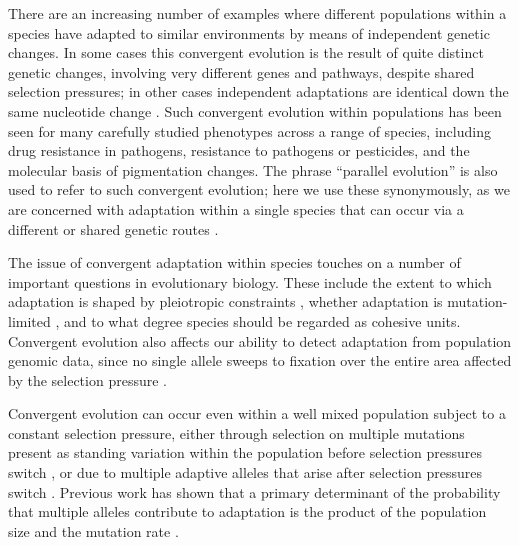 \documentclass{article}
\begin{document}
There are an increasing number of examples where
different populations within a species have
adapted to similar environments by means of independent genetic changes. 
In some cases this convergent evolution is the result of quite
distinct genetic changes, involving very different genes and pathways, despite shared selection pressures; 
in other cases independent adaptations are identical down the same
nucleotide change
\citep{Jeong20141,stern2013genetic,MartinOrgogozo:13, Conte2012}. 
Such convergent evolution within populations has been seen for many
carefully studied phenotypes across a range of species, 
including drug resistance in pathogens,
resistance to pathogens or pesticides,
and the molecular basis of pigmentation changes.
The phrase ``parallel evolution'' is also used to refer to such convergent evolution;
here we use these synonymously, 
as we are concerned with adaptation within a single
species that can occur via a different or shared genetic routes \citep[see][for more discussion]{Arendt:08}.

The issue of convergent adaptation within species touches on a number
of important questions in evolutionary biology. 
These include the extent to which adaptation is shaped by pleiotropic constraints \citep{Haldane:book,Orr:05},
whether adaptation is mutation-limited \citep{Bradshaw:91,karasov2010}, 
and to what degree species should be regarded as cohesive units. 
Convergent evolution also affects our ability to detect adaptation from population genomic data,
since no single allele sweeps to fixation over the entire area affected by the selection pressure \citep{softsweepsIII}.

Convergent evolution can occur even within a well mixed population
subject to a constant selection pressure, 
either through selection on multiple mutations present as standing variation within the population
before selection pressures switch \citep{Orr:01,softsweepsI},
or due to multiple adaptive alleles that arise after selection pressures switch \citep{softsweepsII}. 
Previous work has shown that 
a primary determinant of the probability that multiple alleles contribute to adaptation
is the product of the population size and the mutation rate \citep[see][for a review]{MesserPetrov}. 
\end{document}

